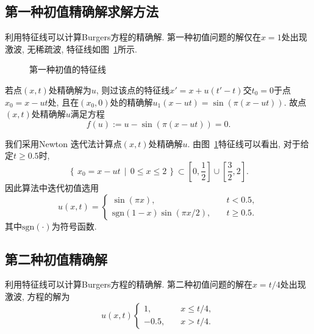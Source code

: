 \documentclass[a4paper, 12pt]{amsart}
\newcommand{\set}[2]{\left\{\,#1\,\mid\,#2\,\right\}}
\newcommand{\sgn}{\mathrm{sgn}}
\numberwithin{equation}{section}
\begin{document}
\subsection{第一种初值精确解求解方法}\hspace*{\fill}\par
利用特征线可以计算Burgers方程的精确解. 第一种初值问题的解仅在$x=1$处出现激波, 无稀疏波, 特征线如图~\ref{fig:chr}所示.
\begin{figure}[htbp]\centering{}\caption{第一种初值的特征线}\label{fig:chr}\end{figure}

若点$(x,t)$处精确解为$u$, 则过该点的特征线$x'=x+u(t'-t)$交$t_0=0$于点$x_0=x-ut$处, 且在$(x_0,0)$处的精确解$u_1(x-ut)=\sin(\pi(x-ut))$. 故点$(x,t)$处精确解$u$满足方程
\[f(u):=u-\sin(\pi(x-ut))=0.\]

我们采用Newton 迭代法计算点$(x,t)$处精确解$u$. 由图~\ref{fig:chr}特征线可以看出, 对于给定$t\ge0.5$时, \[\set{x_0=x-ut}{0\le x\le2}\subset\left[0,\dfrac12\right]\cup\left[\dfrac32,2\right].\]
因此算法中迭代初值选用
\begin{equation}\label{eq:init}u(x,t)=\begin{cases}
\sin(\pi x),\quad&t<0.5,\\
\sgn(1-x)\sin(\pi x/2),\quad&t\ge0.5.
\end{cases}\end{equation}
其中$\sgn(\cdot)$为符号函数.

\subsection{第二种初值精确解}\hspace*{\fill}\par
利用特征线可以计算Burgers方程的精确解. 第二种初值问题的解在$x=t/4$处出现激波, 方程的解为
\[u(x,t)\begin{cases}
1,\quad&x\le t/4,\\
-0.5,\quad&x>t/4.
\end{cases}\]
\end{document}
